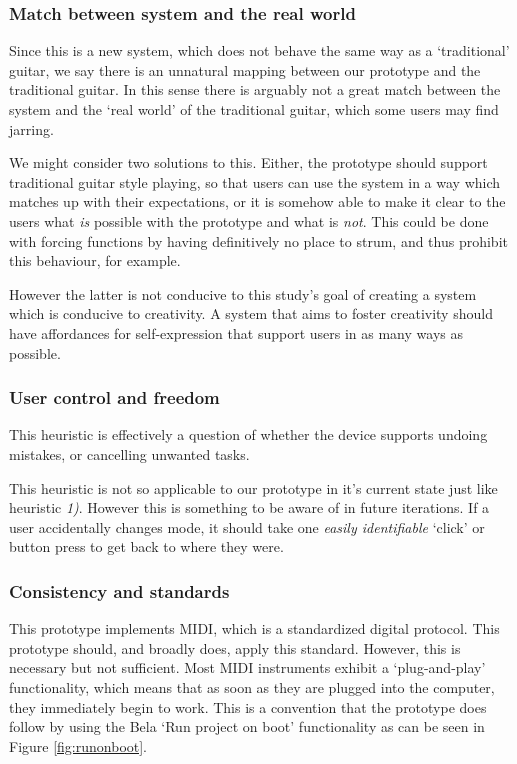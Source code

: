 \subsubsection{Match between system and the real world}
Since this is a new system, which does not behave the same way as a `traditional' guitar, we say there is an unnatural mapping between our prototype and the traditional guitar. In this sense there is arguably not a great match between the system and the `real world' of the traditional guitar, which some users may find jarring.

We might consider two solutions to this. Either, the prototype should support traditional guitar style playing, so that users can use the system in a way which matches up with their expectations, or it is somehow able to make it clear to the users what \textit{is} possible with the prototype and what is \textit{not}. This could be done with forcing functions by having definitively no place to strum, and thus prohibit this behaviour, for example. 

However the latter is not conducive to this study's goal of creating a system which is conducive to creativity. A system that aims to foster creativity should have affordances for self-expression that support users in as many ways as possible. 

\subsubsection{User control and freedom}
This heuristic is effectively a question of whether the device supports undoing mistakes, or cancelling unwanted tasks. 

This heuristic is not so applicable to our prototype in it's current state just like heuristic \textit{1)}. However this is something to be aware of in future iterations. If a user accidentally changes mode, it should take one \textit{easily identifiable} `click' or button press to get back to where they were. 

\subsubsection{Consistency and standards}
This prototype implements MIDI, which is a standardized digital protocol. This prototype should, and broadly does, apply this standard. However, this is necessary but not sufficient. Most MIDI instruments exhibit a `plug-and-play' functionality, which means that as soon as they are plugged into the computer, they immediately begin to work. This is a convention that the prototype does follow by using the Bela `Run project on boot' functionality as can be seen in Figure \ref{fig:runonboot}. 

